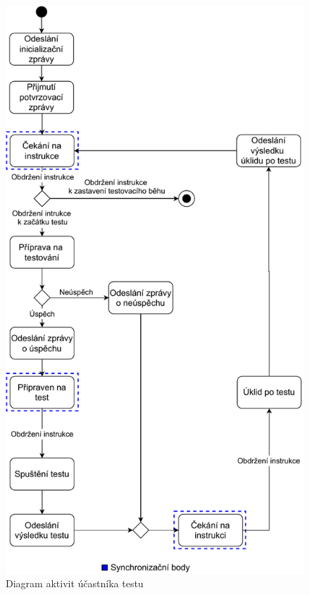 \begin{figure}
    \centering 
    \includegraphics[height=0.98\textheight]{assets/img/bp_assets/activitydiagramdevice.pdf}
    \caption{Diagram aktivit účastníka testu}
    \label{fig:act_diag_device}
\end{figure}



